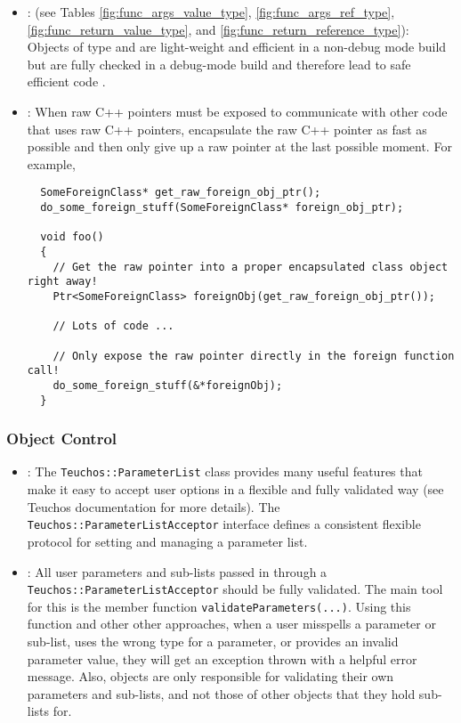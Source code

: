\begin{itemize}
{}\item\GCGSemiPersisting: (see Tables
{}\ref{fig:func_args_value_type}, {}\ref{fig:func_args_ref_type},
{}\ref{fig:func_return_value_type}, and
{}\ref{fig:func_return_reference_type}): Objects of type {}
and {} are light-weight and efficient in a non-debug
mode build but are fully checked in a debug-mode build and therefore
lead to safe efficient code {}\cite{TeuchosMemoryManagementGuide}.


{}\item\GCGPostponeRawPointers: When raw C++ pointers must be exposed to
communicate with other code that uses raw C++ pointers, encapsulate the raw
C++ pointer as fast as possible and then only give up a raw pointer at the
last possible moment.  For example,

{\small\begin{verbatim}
  SomeForeignClass* get_raw_foreign_obj_ptr();
  do_some_foreign_stuff(SomeForeignClass* foreign_obj_ptr);

  void foo()
  {
    // Get the raw pointer into a proper encapsulated class object right away!
    Ptr<SomeForeignClass> foreignObj(get_raw_foreign_obj_ptr());

    // Lots of code ...

    // Only expose the raw pointer directly in the foreign function call! 
    do_some_foreign_stuff(&*foreignObj);
  }
\end{verbatim}}


\end{itemize}


%
\subsubsection{Object Control}
%


\begin{itemize}


{}\item\GCGTeuchosParamterListAcceptor: The
{}\texttt{Teuchos\-::Parameter\-List} class provides many useful features that
make it easy to accept user options in a flexible and fully validated way (see
Teuchos documentation for more details).  The
{}\texttt{Teuchos\-::Parameter\-List\-Acceptor} interface defines a consistent
flexible protocol for setting and managing a parameter list.


{}\item\GCGTeuchosParamterListValidation: All user parameters and
sub-lists passed in through a
{}\texttt{Teuchos\-::Parameter\-List\-Acceptor} should be fully
validated.  The main tool for this is the member function
{}\texttt{validateParameters(...)}.  Using this function and other
other approaches, when a user misspells a parameter or sub-list, uses
the wrong type for a parameter, or provides an invalid parameter
value, they will get an exception thrown with a helpful error message.
Also, objects are only responsible for validating their own parameters
and sub-lists, and not those of other objects that they hold sub-lists
for.


\end{itemize}


